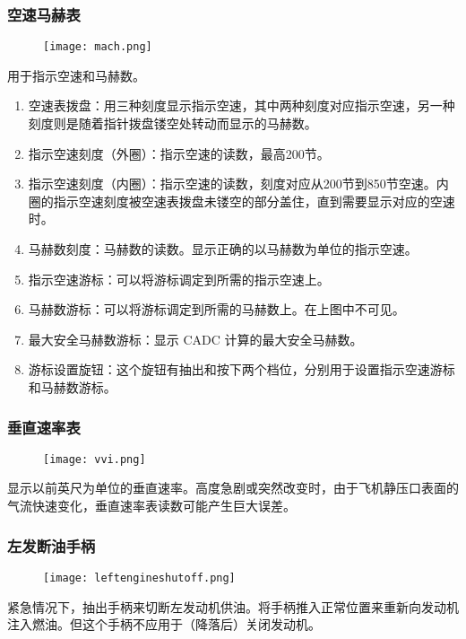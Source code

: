 \subsubsection{空速马赫表}

\begin{figure}[htb]
	\centering
	\texttt{[image: mach.png]}
\end{figure}
用于指示空速和马赫数。

\begin{enumerate}
	\item 空速表拨盘：用三种刻度显示指示空速，其中两种刻度对应指示空速，另一种刻度则是随着指针拨盘镂空处转动而显示的马赫数。
	\item 指示空速刻度（外圈）：指示空速的读数，最高200节。
	\item 指示空速刻度（内圈）：指示空速的读数，刻度对应从200节到850节空速。内圈的指示空速刻度被空速表拨盘未镂空的部分盖住，直到需要显示对应的空速时。
	\item 马赫数刻度：马赫数的读数。显示正确的以马赫数为单位的指示空速。
	\item 指示空速游标：可以将游标调定到所需的指示空速上。
	\item 马赫数游标：可以将游标调定到所需的马赫数上。在上图中不可见。
	\item 最大安全马赫数游标：显示 CADC 计算的最大安全马赫数。
	\item 游标设置旋钮：这个旋钮有抽出和按下两个档位，分别用于设置指示空速游标和马赫数游标。
\end{enumerate}

\subsubsection{垂直速率表}

\begin{figure}[htb]
	\centering
	\texttt{[image: vvi.png]}
\end{figure}
显示以前英尺为单位的垂直速率。高度急剧或突然改变时，由于飞机静压口表面的气流快速变化，垂直速率表读数可能产生巨大误差。

\subsubsection{左发断油手柄}

\begin{figure}[htb]
	\centering
	\texttt{[image: leftengineshutoff.png]}
\end{figure}
紧急情况下，抽出手柄来切断左发动机供油。将手柄推入正常位置来重新向发动机注入燃油。但这个手柄不应用于（降落后）关闭发动机。

